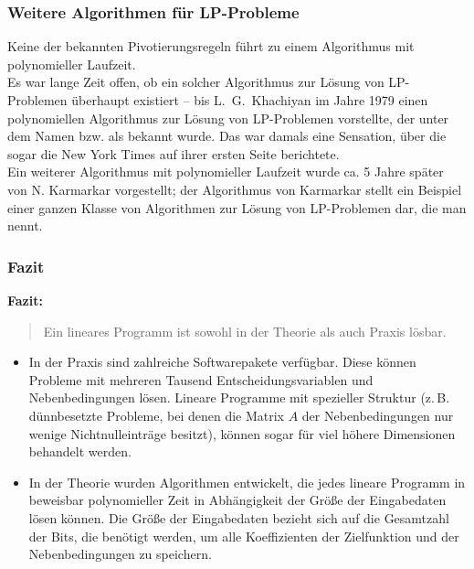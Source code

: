 \documentclass[smaller]{beamer}
\begin{document}
\begin{frame}
 \frametitle{Weitere Algorithmen für LP-Probleme}
 Keine der bekannten Pivotierungsregeln führt zu einem Algorithmus mit polynomieller Laufzeit. \\ \vspace*{0.2cm}
 Es war lange Zeit offen, ob ein solcher Algorithmus zur Lösung von LP-Problemen überhaupt existiert -- bis \alert{L.~G.~Khachiyan} im Jahre 1979 einen polynomiellen Algorithmus zur Lösung von LP-Problemen vorstellte, der unter dem Namen  bzw. als  bekannt wurde. Das war damals eine Sensation, über die sogar die New York Times auf ihrer ersten Seite berichtete. \\ \vspace*{0.2cm}
 Ein weiterer Algorithmus mit polynomieller Laufzeit wurde ca. 5 Jahre später von \alert{N. Karmarkar} vorgestellt; der Algorithmus von Karmarkar stellt ein Beispiel einer ganzen Klasse von Algorithmen zur Lösung von LP-Problemen dar, die man  nennt.
\end{frame}

\begin{frame}
 \frametitle{Fazit}
 \textbf{Fazit:}
\begin{quote}
\alert{Ein lineares Programm ist sowohl in der Theorie als auch Praxis lösbar.}
\end{quote}

\begin{itemize}
\item \alert{In der Praxis} sind zahlreiche Softwarepakete verfügbar. Diese können Probleme mit mehreren Tausend Entscheidungsvariablen und Nebenbedingungen lösen. Lineare Programme mit spezieller Struktur (z.\,B. dünnbesetzte Probleme, bei denen die Matrix $A$ der Nebenbedingungen nur wenige Nichtnulleinträge besitzt), können sogar für viel höhere Dimensionen behandelt werden.

\item \alert{In der Theorie} wurden Algorithmen entwickelt, die jedes lineare Programm in beweisbar polynomieller Zeit in Abhängigkeit der {\glqq}Größe{\grqq} der Eingabedaten lösen können. Die {\glqq}Größe{\grqq} der Eingabedaten bezieht sich auf die Gesamtzahl der Bits, die benötigt werden, um alle Koeffizienten der Zielfunktion und der Nebenbedingungen zu speichern. 
\end{itemize}

 
\end{frame}
\end{document}
